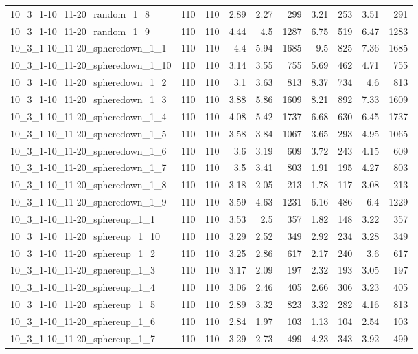 \begin{center}
\begin{scriptsize}
\begin{longtable}{lrrrrrrrrr}
10\_3\_1-10\_11-20\_random\_1\_8 & 110 & 110 & 2.89 & 2.27 & 299 & 3.21 & 253 & 3.51 & 291\\
10\_3\_1-10\_11-20\_random\_1\_9 & 110 & 110 & 4.44 & 4.5 & 1287 & 6.75 & 519 & 6.47 & 1283\\
10\_3\_1-10\_11-20\_spheredown\_1\_1 & 110 & 110 & 4.4 & 5.94 & 1685 & 9.5 & 825 & 7.36 & 1685\\
10\_3\_1-10\_11-20\_spheredown\_1\_10 & 110 & 110 & 3.14 & 3.55 & 755 & 5.69 & 462 & 4.71 & 755\\
10\_3\_1-10\_11-20\_spheredown\_1\_2 & 110 & 110 & 3.1 & 3.63 & 813 & 8.37 & 734 & 4.6 & 813\\
10\_3\_1-10\_11-20\_spheredown\_1\_3 & 110 & 110 & 3.88 & 5.86 & 1609 & 8.21 & 892 & 7.33 & 1609\\
10\_3\_1-10\_11-20\_spheredown\_1\_4 & 110 & 110 & 4.08 & 5.42 & 1737 & 6.68 & 630 & 6.45 & 1737\\
10\_3\_1-10\_11-20\_spheredown\_1\_5 & 110 & 110 & 3.58 & 3.84 & 1067 & 3.65 & 293 & 4.95 & 1065\\
10\_3\_1-10\_11-20\_spheredown\_1\_6 & 110 & 110 & 3.6 & 3.19 & 609 & 3.72 & 243 & 4.15 & 609\\
10\_3\_1-10\_11-20\_spheredown\_1\_7 & 110 & 110 & 3.5 & 3.41 & 803 & 1.91 & 195 & 4.27 & 803\\
10\_3\_1-10\_11-20\_spheredown\_1\_8 & 110 & 110 & 3.18 & 2.05 & 213 & 1.78 & 117 & 3.08 & 213\\
10\_3\_1-10\_11-20\_spheredown\_1\_9 & 110 & 110 & 3.59 & 4.63 & 1231 & 6.16 & 486 & 6.4 & 1229\\
10\_3\_1-10\_11-20\_sphereup\_1\_1 & 110 & 110 & 3.53 & 2.5 & 357 & 1.82 & 148 & 3.22 & 357\\
10\_3\_1-10\_11-20\_sphereup\_1\_10 & 110 & 110 & 3.29 & 2.52 & 349 & 2.92 & 234 & 3.28 & 349\\
10\_3\_1-10\_11-20\_sphereup\_1\_2 & 110 & 110 & 3.25 & 2.86 & 617 & 2.17 & 240 & 3.6 & 617\\
10\_3\_1-10\_11-20\_sphereup\_1\_3 & 110 & 110 & 3.17 & 2.09 & 197 & 2.32 & 193 & 3.05 & 197\\
10\_3\_1-10\_11-20\_sphereup\_1\_4 & 110 & 110 & 3.06 & 2.46 & 405 & 2.66 & 306 & 3.23 & 405\\
10\_3\_1-10\_11-20\_sphereup\_1\_5 & 110 & 110 & 2.89 & 3.32 & 823 & 3.32 & 282 & 4.16 & 813\\
10\_3\_1-10\_11-20\_sphereup\_1\_6 & 110 & 110 & 2.84 & 1.97 & 103 & 1.13 & 104 & 2.54 & 103\\
10\_3\_1-10\_11-20\_sphereup\_1\_7 & 110 & 110 & 3.29 & 2.73 & 499 & 4.23 & 343 & 3.92 & 499\\

\end{longtable}
\end{scriptsize}
\end{center}
